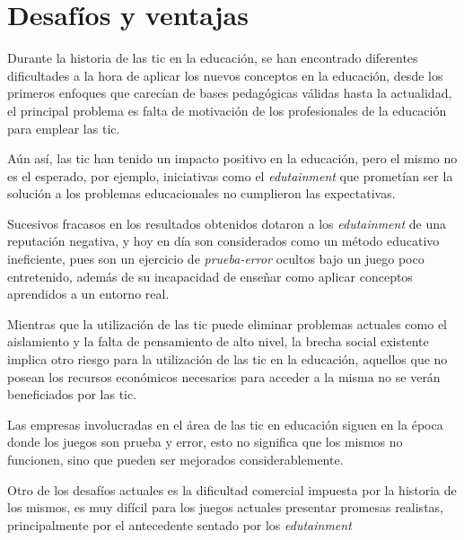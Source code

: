 \section{Desafíos y ventajas}
\label{sec:tics_ventajas}

Durante la historia de las \Gls{tic} en la educación, se han encontrado
diferentes dificultades a la hora de aplicar los nuevos conceptos en la
educación, desde los primeros enfoques que carecían de bases pedagógicas válidas
hasta la actualidad, el principal problema es falta de motivación de los
profesionales de la educación para emplear las
\Gls{tic}\cite{punie:ict,ict:romeo}.


Aún así, las \Gls{tic} han tenido un impacto positivo en la educación, pero el
mismo no es el esperado\cite{punie:ict}, por ejemplo, iniciativas como el
\emph{edutainment} que prometían ser la solución a los problemas
educacionales no cumplieron las expectativas.

Sucesivos fracasos en los resultados obtenidos dotaron a los \emph{edutainment}
de una reputación negativa, y hoy en día son considerados como un método educativo 
ineficiente, pues son un ejercicio de \emph{prueba-error} ocultos bajo un juego poco 
entretenido, además de su incapacidad de enseñar como aplicar conceptos aprendidos 
a un entorno real\cite{resnick:2004}.

Mientras que la utilización de las \Gls{tic} puede eliminar problemas actuales
como el aislamiento y la falta de pensamiento de alto nivel\cite{punie:ict}, la
brecha social existente implica otro riesgo para la utilización de las \Gls{tic}
en la educación, aquellos que no posean los recursos económicos necesarios para
acceder a la misma no se verán beneficiados por las \Gls{tic}\cite{punie:ict}.

Las empresas involucradas en el área de las \Gls{tic} en
educación siguen en la época donde los juegos son prueba y error, esto no
significa que los mismos no funcionen, sino que pueden ser mejorados
considerablemente\cite{egenfeldt2007third}.

Otro de los desafíos actuales es la dificultad comercial impuesta por la
historia de los mismos, es muy difícil para los juegos actuales presentar
promesas realistas, principalmente por el antecedente sentado por los
\emph{edutainment}\cite{egenfeldt2007third}

